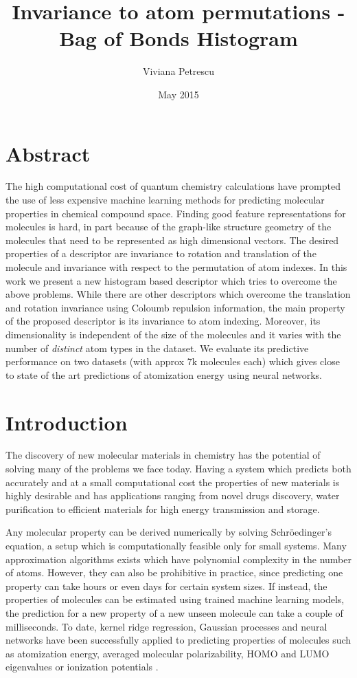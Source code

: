 \documentclass{article}
\title{Invariance to atom permutations - Bag of Bonds Histogram}
\author{Viviana Petrescu }
\date{May 2015}
\begin{document}
\maketitle

\section{Abstract}
The high computational cost of quantum chemistry calculations have prompted the use of less expensive machine learning methods for predicting molecular properties in chemical compound space.
Finding good feature representations for molecules is hard, in part because of the graph-like structure geometry of the molecules that need to be represented as high dimensional vectors. The desired properties of a descriptor are invariance to rotation and translation of the molecule and invariance with respect to the permutation of atom indexes.
In this work we present a new histogram based descriptor which tries to overcome the above problems. While there are other descriptors which overcome the translation and rotation invariance using Coloumb repulsion information, the main property of the proposed descriptor is its invariance to atom indexing. Moreover, its dimensionality is independent of the size of the molecules and it varies with the number of \textit{distinct} atom types in the dataset.
We evaluate its predictive performance on two datasets (with approx 7k molecules each) which gives close to state of the art predictions of atomization energy using neural networks. 

\section{Introduction}
The discovery of new molecular materials in chemistry has the potential of solving many of the problems we face today.
Having a system which predicts both accurately and at a small computational cost the properties of new materials is highly desirable and has applications ranging from novel drugs discovery, water purification to efficient materials for high energy transmission and storage\cite{cleanenergy}.

Any molecular property can be derived numerically by solving Schröedinger's equation, a setup which is computationally feasible only for small systems. Many approximation algorithms exists which have polynomial complexity in the number of atoms. However, they can also be prohibitive in practice, since predicting one property can take hours or even days for certain system sizes.
If instead, the properties of molecules can be estimated using trained machine learning models, the prediction for a new property of a new unseen molecule can take a couple of milliseconds. To date, kernel ridge regression, Gaussian processes and neural networks have been successfully applied to predicting properties of molecules such as atomization energy, averaged molecular polarizability, HOMO and LUMO eigenvalues or ionization potentials \citep{assessment}.
\end{document}
